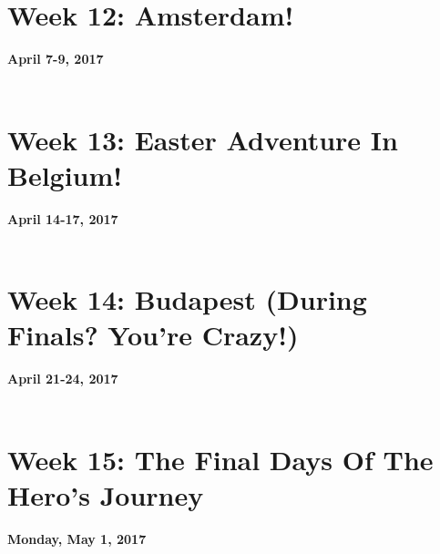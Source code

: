 \documentclass[oneside, 12pt]{book}
\begin{document}
\chapter{Week 12: Amsterdam!}
\textbf{April 7-9, 2017}\\\\


\chapter{Week 13: Easter Adventure In Belgium!}
\textbf{April 14-17, 2017}\\\\


\chapter{Week 14: Budapest (During Finals? You're Crazy!)}
\textbf{April 21-24, 2017}\\\\


\chapter{Week 15: The Final Days Of The Hero's Journey}
\textbf{Monday, May 1, 2017}\\\\

\end{document}
